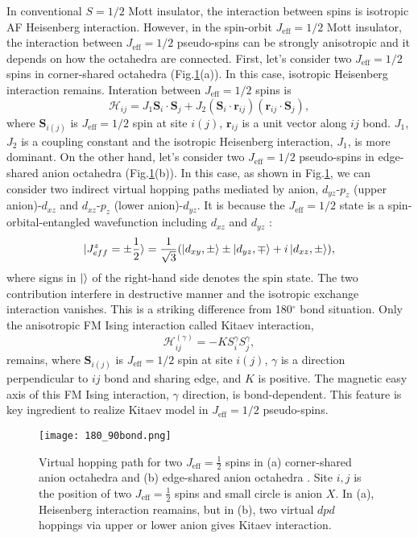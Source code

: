 In conventional $S = 1/2$ Mott insulator, the interaction between spins is isotropic AF Heisenberg interaction.
However, in the spin-orbit $J_\mathrm{eff} = 1/2$ Mott insulator, the interaction between $J_\mathrm{eff} = 1/2$ pseudo-spins can be strongly anisotropic \cite{jackeli2009mott}
and it depends on how the octahedra are connected.
First, let's consider two $J_\mathrm{eff} = 1/2$ spins in corner-shared octahedra (Fig.\ref{180_90bond}(a)).
In this case, isotropic Heisenberg interaction remains.
Interation between $J_\mathrm{eff} = 1/2$ spins is
\begin{equation}
\mathcal{H}_{ij} = J_1\bm{S}_i\cdot\bm{S}_j + J_2(\bm{S}_i\cdot\bm{r}_{ij})(\bm{r}_{ij}\cdot\bm{S}_j),
\end{equation}
where $\bm{S}_{i(j)}$ is  $J_{\mathrm{eff}} = 1/2$ spin at site $i(j)$, $\bm{r}_{ij}$ is a unit vector along $ij$ bond.
$J_1$, $J_2$ is a coupling constant and the isotropic Heisenberg interaction, $J_1$, is more dominant.
On the other hand, let's consider two $J_\mathrm{eff} = 1/2$ pseudo-spins in edge-shared anion octahedra (Fig.\ref{180_90bond}(b)).
In this case, as shown in Fig.\ref{180_90bond}, we can consider two indirect virtual hopping paths mediated by anion,
$d_{yz}$-$p_z$ (upper anion)-$d_{xz}$ and $d_{xz}$-$p_z$ (lower anion)-$d_{yz}$.
It is because the $J_{\mathrm{eff}} = 1/2$ state is a spin-orbital-entangled wavefunction including $d_{xz}$ and $d_{yz}$ \cite{jackeli2009mott}:
\begin{align}
\ket{J^z_{eff} = \pm \frac{1}{2}} = \frac{1}{\sqrt{3}}(\ket{d_{xy}, \pm}\pm\ket{d_{yz}, \mp}+i\ket{d_{xz}, \pm}),
\label{Jeff}
\end{align}
where signs in $\ket{}$ of the right-hand side denotes the spin state.
The two contribution interfere in destructive manner and the isotropic exchange interaction vanishes.
This is a striking difference from 180$^\circ$ bond situation.
Only the anisotropic FM Ising interaction called Kitaev interaction,
\begin{equation}
\mathcal{H}^{(\gamma)}_{ij} = -KS^\gamma_iS^\gamma_j,
\label{Kitaev}
\end{equation}
remains, where $\bm{S}_{i(j)}$ is  $J_{\mathrm{eff}} = 1/2$ spin at site $i(j)$, $\gamma$ is a direction perpendicular to $ij$ bond and sharing edge, and $K$ is positive.
The magnetic easy axis of this FM Ising interaction, $\gamma$ direction, is bond-dependent.
This feature is key ingredient to realize Kitaev model in $J_{\mathrm{eff}} = 1/2$ pseudo-spins.

\begin{figure}
  \centering
  \texttt{[image: 180\_90bond.png]}
  \caption{Virtual hopping path for two $J_{\mathrm{eff}} = \frac{1}{2}$ spins in (a) corner-shared anion octahedra and (b) edge-shared anion octahedra \cite{jackeli2009mott}.
  Site $i, j$ is the position of two $J_{\mathrm{eff}} = \frac{1}{2}$ spins and small circle is anion $X$.
  In (a), Heisenberg interaction reamains, but in (b), two virtual $dpd$ hoppings via upper or lower anion gives Kitaev interaction.}
  \label{180_90bond}
\end{figure}

